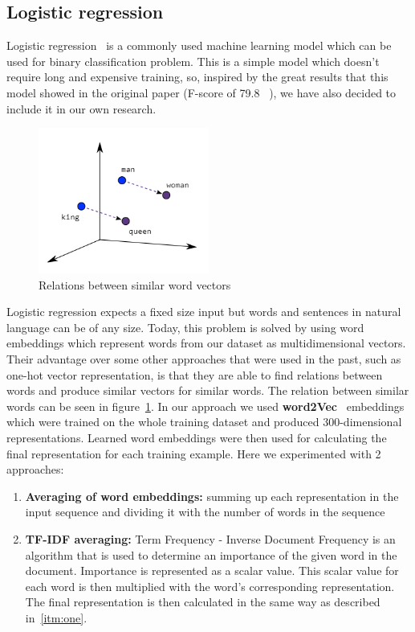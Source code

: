 \documentclass[10pt, a4paper]{article}
\begin{document}
\subsection{Logistic regression}
Logistic regression~\citep{logreg} is a commonly used machine learning model which can be used for binary classification problem.
This is a simple model which doesn't require long and expensive training, so, inspired by the great results that this model showed in the original paper (F-score of 79.8 ~\citep{turcan-mckeown-2019-dreaddit}), we have also decided to
include it in our own research.

\begin{figure}[h]
    \centering
    \includegraphics[width=0.5\textwidth]{images/embeddings}
    \caption{Relations between similar word vectors}
    \label{fig:embedding}
\end{figure}
\hfill \break
\hfill \break
\hfill \break
Logistic regression expects a fixed size input but words and sentences in natural language can be of any size.
Today, this problem is solved by using word embeddings which represent words from our dataset as multidimensional vectors.
Their advantage over some other approaches that were used in the past, such as one-hot vector representation, is that they are able to find relations between words and produce similar vectors for similar words.
The relation between similar words can be seen in figure~\ref{fig:embedding}.
In our approach we used \textbf{word2Vec}~\citep{mikolov2013efficient} embeddings which were trained on the whole training dataset and produced 300-dimensional representations.
Learned word embeddings were then used for calculating the final representation for each training example.
Here we experimented with 2 approaches:
\begin{enumerate}
    \item \label{itm:one} \textbf{Averaging of word embeddings:} summing up each representation in the input sequence and dividing it with the number of words in the sequence
    \item \textbf{TF-IDF averaging:} Term Frequency - Inverse Document Frequency is an algorithm that is used to determine an importance of the given word in the document.
    Importance is represented as a scalar value.
     This scalar value for each word is then multiplied with the word's corresponding representation.
    The final representation is then calculated in the same way as described in~\ref{itm:one}.

\end{enumerate}
\end{document}
